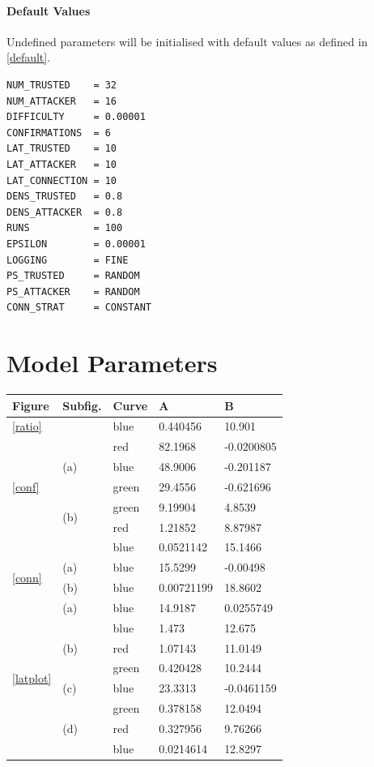 \documentclass[a4paper,12pt,twoside]{report}
\begin{document}
\subsubsection{Default Values}\label{defaultval}
Undefined parameters will be initialised with default values as defined in \autoref{default}. 
\begin{lstlisting}[caption=Default parameter values,label=default]
NUM_TRUSTED    = 32
NUM_ATTACKER   = 16
DIFFICULTY     = 0.00001
CONFIRMATIONS  = 6
LAT_TRUSTED    = 10
LAT_ATTACKER   = 10
LAT_CONNECTION = 10
DENS_TRUSTED   = 0.8
DENS_ATTACKER  = 0.8
RUNS           = 100
EPSILON        = 0.00001
LOGGING        = FINE
PS_TRUSTED     = RANDOM
PS_ATTACKER    = RANDOM
CONN_STRAT     = CONSTANT
\end{lstlisting}

\chapter{Model Parameters} \label{modelparams}
\begin{table}[ht]
\centering
\begin{tabular}{|l|l|l|l|l|}
\hline
Figure & Subfig. & Curve & A & B \\ \hline
\ref{ratio}					&					   & blue & 0.440456 & 10.901 \\ \hline
\multirow{5}{*}{\ref{conf}} & \multirow{3}{*}{(a)} & red & 82.1968 & -0.0200805 \\
 							& 					   & blue & 48.9006 & -0.201187 \\
 							& 					   & green & 29.4556 & -0.621696 \\ \cline{2-5}	
 							& \multirow{2}{*}{(b)} & green & 9.19904 & 4.8539 \\
 							&					   & red & 1.21852 & 8.87987 \\
 							& 					   & blue & 0.0521142 & 15.1466 \\ \hline
\multirow{2}{*}{\ref{conn}} & (a) & blue & 15.5299 & -0.00498 \\ \cline{2-5}	
 							& (b) & blue & 0.00721199 & 18.8602 \\ \hline
\multirow{8}{*}{\ref{latplot}} & (a)				   & blue & 14.9187 & 0.0255749 \\ \cline{2-5}	
 							& \multirow{3}{*}{(b)} & blue & 1.473 & 12.675 \\
 							& 					   & red & 1.07143 & 11.0149 \\ 
 							& 					   & green & 0.420428 & 10.2444 \\ \cline{2-5}	
							& (c)				   & blue & 23.3313 & -0.0461159 \\ \cline{2-5}	
 							& \multirow{3}{*}{(d)} & green & 0.378158 & 12.0494 \\
 							& 					   & red & 0.327956 & 9.76266 \\ 
 							& 					   & blue & 0.0214614 & 12.8297 \\ \hline
\end{tabular}
\end{table}
\end{document}
